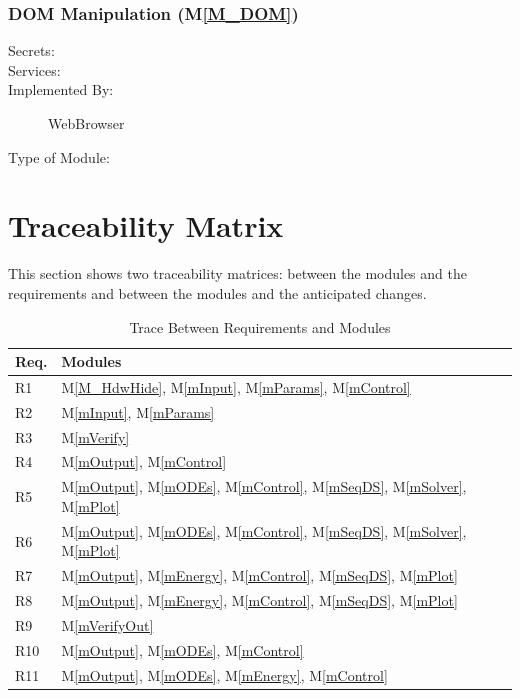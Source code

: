 \documentclass[12pt, titlepage]{article}
\newcommand{\mref}[1]{M\ref{#1}}
\begin{document}
\subsubsection{DOM Manipulation (\mref{M_DOM})}
\begin{description}
\item[Secrets:]
\item[Services:]
\item[Implemented By:] WebBrowser
\item[Type of Module:] 
\end{description}



\section{Traceability Matrix} \label{SecTM}

This section shows two traceability matrices: between the modules and the
requirements and between the modules and the anticipated changes.

\begin{table}[H]
\centering
\begin{tabular}{p{} p{}}
\toprule
\textbf{Req.} & \textbf{Modules}\\
\midrule
R1 & \mref{M_HdwHide}, \mref{mInput}, \mref{mParams}, \mref{mControl}\\
R2 & \mref{mInput}, \mref{mParams}\\
R3 & \mref{mVerify}\\
R4 & \mref{mOutput}, \mref{mControl}\\
R5 & \mref{mOutput}, \mref{mODEs}, \mref{mControl}, \mref{mSeqDS}, \mref{mSolver}, \mref{mPlot}\\
R6 & \mref{mOutput}, \mref{mODEs}, \mref{mControl}, \mref{mSeqDS}, \mref{mSolver}, \mref{mPlot}\\
R7 & \mref{mOutput}, \mref{mEnergy}, \mref{mControl}, \mref{mSeqDS}, \mref{mPlot}\\
R8 & \mref{mOutput}, \mref{mEnergy}, \mref{mControl}, \mref{mSeqDS}, \mref{mPlot}\\
R9 & \mref{mVerifyOut}\\
R10 & \mref{mOutput}, \mref{mODEs}, \mref{mControl}\\
R11 & \mref{mOutput}, \mref{mODEs}, \mref{mEnergy}, \mref{mControl}\\
\bottomrule
\end{tabular}
\caption{Trace Between Requirements and Modules}
\label{TblRT}
\end{table}
\end{document}
